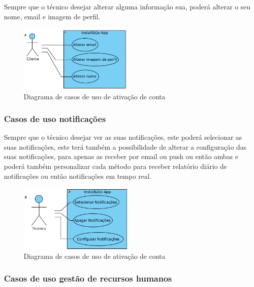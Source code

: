 Sempre que o técnico desejar alterar alguma informação sua, poderá alterar o seu nome, email e imagem 
de perfil.

\begin{figure}[htb]
    \centering
    
    \includegraphics[width=0.5\textwidth]{images/diagramas/casos_de_uso/use_case_perfil.png}
    \caption{Diagrama de casos de uso de ativação de conta}
    \label{fig:14}
\end{figure}

\newpage

\subsubsection{Casos de uso notificações}

Sempre que o técnico desejar ver as suas notificações, este poderá selecionar as suas notificações, este
terá também a possibilidade de alterar a configuração das suas notificações, para apenas as receber 
por email ou push ou então ambas e poderá também personalizar cada método para receber
relatório diário de notificações ou então notificações em tempo real.

\begin{figure}[htb]
    \centering
    \includegraphics[width=0.5\textwidth]{images/diagramas/casos_de_uso/use_case_notificacoes.png}
    \caption{Diagrama de casos de uso de ativação de conta}
    \label{fig:15}
\end{figure}

\subsubsection{Casos de uso gestão de recursos humanos}

